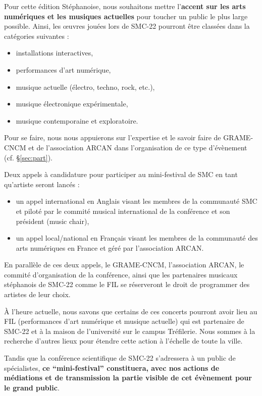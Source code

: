 \documentclass[fontsize=12pt]{scrartcl} %
\numberwithin{equation}{section} %
\numberwithin{table}{section} %
\begin{document}
Pour cette édition Stéphanoise, nous souhaitons mettre l'\textbf{accent sur les arts numériques et les musiques actuelles} pour toucher un public le plus large possible. Ainsi, les œuvres jouées lors de SMC-22 pourront être classées dans la catégories suivantes :

\begin{itemize}
  \item installations interactives,
  \item performances d'art numérique,
  \item musique actuelle (électro, techno, rock, etc.),
  \item musique électronique expérimentale,
  \item musique contemporaine et exploratoire. 
\end{itemize} 

Pour se faire, nous nous appuierons sur l'expertise et le savoir faire de GRAME-CNCM et de l'association ARCAN dans l'organisation de ce type d'évènement (cf. \S\ref{sec:part}).

Deux appels à candidature pour participer au mini-festival de SMC en tant qu'artiste seront lancés : 

\begin{itemize}
  \item un appel international en Anglais visant les membres de la communauté SMC et piloté par le commité musical international de la conférence et son président (music chair),
  \item un appel local/national en Français visant les membres de la communauté des arts numériques en France et géré par l'association ARCAN.
\end{itemize} 

En parallèle de ces deux appels, le GRAME-CNCM, l'association ARCAN, le commité d'organisation de la conférence, ainsi que les partenaires musicaux stéphanois de SMC-22 comme le FIL se réserveront le droit de programmer des artistes de leur choix. 

À l'heure actuelle, nous savons que certains de ces concerts pourront avoir lieu au FIL (performances d'art numérique et musique actuelle) qui est partenaire de SMC-22 et à la maison de l'université sur le campus Tréfilerie. Nous sommes à la recherche d'autres lieux pour étendre cette action à l'échelle de toute la ville. 

Tandis que la conférence scientifique de SMC-22 s'adressera à un public de spécialistes, \textbf{ce ``mini-festival'' constituera, avec nos actions de médiations et de transmission la partie visible de cet évènement pour le grand public}.
\end{document}
